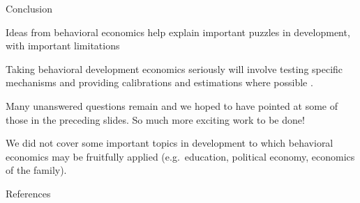 \documentclass[aspectratio=169, 10pt, handout]{beamer}
\newenvironment{wideitemize}{\itemize\addtolength{\itemsep}{10pt}}{\enditemize}
\begin{document}
\begin{frame}{Conclusion}

\begin{wideitemize}

	\item Ideas from behavioral economics help explain important puzzles in development, with important limitations

	\item Taking behavioral development economics seriously will involve testing specific mechanisms and providing calibrations and estimations where possible \citep{dellavigna2018structural}.
	
	\item Many unanswered questions remain and we hoped to have pointed at some of those in the preceding slides. So much more exciting work to be done!

	\item We did not cover some important topics in development to which behavioral economics may be fruitfully applied (e.g.\ education, political economy, economics of the family).

\end{wideitemize}

\end{frame}


\begin{frame}[allowframebreaks]{References}

\footnotesize
\singlespacing

	{}
	

\end{frame}
\end{document}
